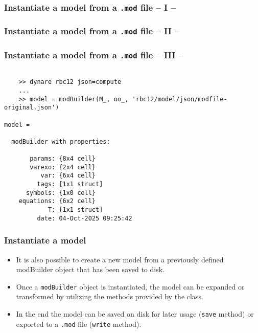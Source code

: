 \documentclass[10pt,slidestop]{beamer}
\theoremstyle{plain}
\begin{document}
\begin{frame}[fragile]
  \frametitle{Instantiate a model from a \texttt{.mod} file -- I --}

  

\end{frame}

\begin{frame}[fragile]
  \frametitle{Instantiate a model from a \texttt{.mod} file -- II --}

  

\end{frame}


\begin{frame}[fragile]
  \frametitle{Instantiate a model from a \texttt{.mod} file -- III --}

  \begin{lstlisting}[style=MatlabConsole]

    >> dynare rbc12 json=compute
    ...
    >> model = modBuilder(M_, oo_, 'rbc12/model/json/modfile-original.json')

model =

  modBuilder with properties:

       params: {8x4 cell}
       varexo: {2x4 cell}
          var: {6x4 cell}
         tags: [1x1 struct]
      symbols: {1x0 cell}
    equations: {6x2 cell}
            T: [1x1 struct]
         date: 04-Oct-2025 09:25:42
   \end{lstlisting}

\end{frame}


\begin{frame}[c,fragile]
  \frametitle{Instantiate a model}

  \begin{itemize}

  \item It is also possible to create a new model from a previously defined modBuilder object that has been saved to disk.\newline

  \item Once a \verb+modBuilder+ object is instantiated, the model can be expanded or transformed by utilizing the methods provided by the class.\newline

  \item In the end the model can be saved on disk for later usage (\verb+save+ method) or exported to a \verb+.mod+ file (\verb+write+ method).

  \end{itemize}

\end{frame}
\end{document}
